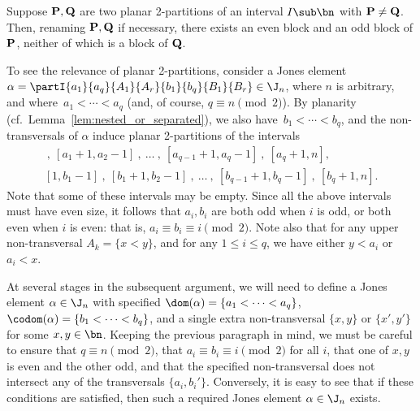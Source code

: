 \newcommand{\bP}{{\bf P}}
\newcommand{\bQ}{{\bf Q}}

\begin{lemma}\label{lem:odd}
Suppose $\bP,\bQ$ are two planar 2-partitions of an interval $I\sub\bn$ with $\bP\not=\bQ$.  Then, renaming $\bP,\bQ$ if necessary, there exists an even block and an odd block of $\bP$, neither of which is a block of $\bQ$. \epfres
\end{lemma}





To see the relevance of planar 2-partitions, consider a Jones element ${\alpha=\partI{a_1}{a_q}{A_1}{A_r}{b_1}{b_q}{B_1}{B_r}\in\J_n}$, where $n$ is arbitrary, and where~$a_1<\cdots<a_q$
(and, of course,  $q\equiv n\pmod2$).  By planarity (cf.~Lemma~\ref{lem:nested_or_separated}), we also have~${b_1<\cdots<b_q}$, and the non-transversals of $\alpha$ induce planar 2-partitions of the intervals
\begin{gather*}
[1,a_1-1]\ , \ [a_1+1,a_2-1] \ ,\ \ldots\ ,\ [a_{q-1}+1,a_q-1]\ ,\  [a_q+1,n] , \\
[1,b_1-1]\  , \ [b_1+1,b_2-1] \ ,\ \ldots\ ,\ [b_{q-1}+1,b_q-1]\ ,\  [b_q+1,n].
\end{gather*}
%
Note that some of these intervals may be empty.  Since all the above intervals must have even size, it follows that $a_i,b_i$ are both odd when $i$ is odd, or both even when $i$ is even: that is, $a_i\equiv b_i\equiv i\pmod2$.  Note also that for any upper non-transversal $A_k=\{x<y\}$, and for any $1\leq i\leq q$, we have either $y<a_i$ or $a_i<x$.  

\begin{rem}\label{rem:Jdefine}
At several stages in the subsequent argument, we will need to define a Jones element $\alpha\in\J_n$ with specified $\dom(\alpha)=\{a_1<\cdots<a_q\}$, $\codom(\alpha)=\{b_1<\cdots<b_q\}$, and a single extra non-transversal $\{x,y\}$ or $\{x',y'\}$ for some $x,y\in\bn$.  
Keeping the previous paragraph in mind, we must be careful to ensure that ${q\equiv n\pmod2}$, that $a_i\equiv b_i\equiv i\pmod2$ for all $i$, that one of $x,y$ is even and the other odd, and that the specified non-transversal does not intersect any of the transversals $\{a_i,b_i'\}$.  Conversely, it is easy to see that if these conditions are satisfied, then such a required Jones element $\alpha\in\J_n$ exists.  
\end{rem}





